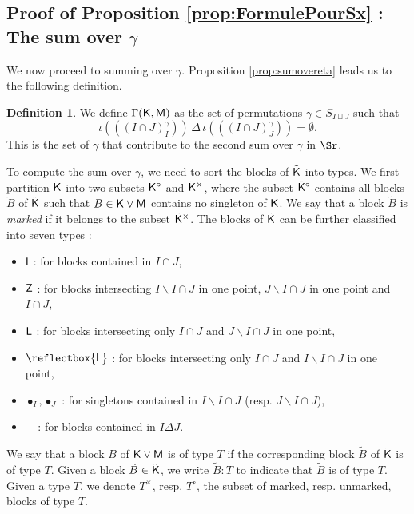 \documentclass[11pt, a4paper, oneside, reqno]{amsart}
\newcommand{\sK}{{\sf K}}
\newcommand{\sM}{{\sf M}}
\theoremstyle{remark}
\theoremstyle{definition}
\newtheorem{definition}[theorem]{Definition}
\numberwithin{equation}{section}
\begin{document}
\subsection{Proof of Proposition \ref{prop:FormulePourSx} : The sum over $\gamma$}
We now proceed to summing over $\gamma$. Proposition \ref{prop:sumovereta} leads us to the following definition.
\newcommand{\Gammas}{{\Gamma({\sf K, M})}}
\begin{definition}
	We define $\Gammas$ as the set of permutations $\gamma \in S_{I\sqcup J}$ such that
	$$\iota(((I\cap J)^{\gamma}_I)) \,\Delta \,\iota(((I\cap J)^{\gamma}_J)) = \emptyset.$$ This is the set of $\gamma$ that contribute to the second sum over $\gamma$ in $\Sr$.
\end{definition}

To compute the sum over $\gamma$, we need to sort the blocks of $\tilde{\sK}$ into types. We first partition $\tilde{\sK}$ into two subsets $\tilde{\sK}^\circ$ and $\tilde{\sK}^\times$, 
where the subset $\tilde{\sK}^{\circ}$ contains all blocks $\tilde{B}$ of $\tilde{\sK}$ such that $B \in \sK\vee \sM$ contains no singleton of $\sK$. We say that a block $\tilde{B}$ is \emph{marked} if it belongs to the subset $\tilde{\sK}^\times$. The blocks of $\tilde{\sK}$ can be further classified into seven types :
\begin{itemize}
	\item ${\sf I}$ : for blocks contained in $I\cap J$,
	\item ${\sf Z}$ : for blocks intersecting $I\backslash I\cap J$ in one point, $J \backslash I \cap J$ in one point and $I\cap J$,
	\item ${\sf L}$ : for blocks intersecting only $I\cap J$ and $J\backslash I\cap J$ in one point,
	\item ${\reflectbox{\sf L}}$ : for blocks intersecting only $I\cap J$ and $I\backslash I\cap J$ in one point,
	\item $\bullet_I,\bullet_J$ : for singletons contained in $I\backslash I \cap J$ (resp. $J\backslash I\cap J$),
	\item $-$ :  for blocks contained in $I\Delta J$.
\end{itemize}
\newcommand{\tI}{{\sf I}}
\newcommand{\tZ}{{\sf Z}}
\newcommand{\tLJ}{{\sf L}}
\newcommand{\tLI}{{\reflectbox{\sf L}}}
\newcommand{\ts}{{\bullet}}
\newcommand{\tP}{{-}}
We say that a block $B$ of $\sK \vee \sM$ is of type $T$ if the corresponding block $\tilde{B}$ of $\tilde{\sK}$ is of type $T$. Given a block $\tilde{B} \in \tilde{\sK}$, we write $\tilde{B}:T$ to indicate that $\tilde{B}$ is of type $T$. Given a type $T$, we denote $T^\times$, resp. $T^\circ$, the subset of marked, resp. unmarked, blocks of type $T$.
\end{document}

